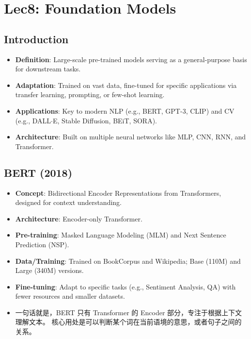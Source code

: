 \documentclass[UTF8]{ctexart}
\begin{document}
\section{Lec8: Foundation Models}
\subsection{Introduction}
\begin{itemize}
    \item \textbf{Definition}: Large-scale pre-trained models serving as a general-purpose basis for downstream tasks.
    \item \textbf{Adaptation}: Trained on vast data, fine-tuned for specific applications via transfer learning, prompting, or few-shot learning.
    \item \textbf{Applications}: Key to modern NLP (e.g., BERT, GPT-3, CLIP) and CV (e.g., DALL$\cdot$E, Stable Diffusion, BEiT, SORA).
    \item \textbf{Architecture}: Built on multiple neural networks like MLP, CNN, RNN, and Transformer.
\end{itemize}

\subsection{BERT (2018)}
\begin{itemize}
    \item \textbf{Concept}: Bidirectional Encoder Representations from Transformers, designed for context understanding.
    \item \textbf{Architecture}: Encoder-only Transformer.
    \item \textbf{Pre-training}: Masked Language Modeling (MLM) and Next Sentence Prediction (NSP).
    \item \textbf{Data/Training}: Trained on BookCorpus and Wikipedia; Base (110M) and Large (340M) versions.
    \item \textbf{Fine-tuning}: Adapt to specific tasks (e.g., Sentiment Analysis, QA) 
    with fewer resources and smaller datasets.
    \item 一句话就是，BERT 只有 Transformer 的 Encoder 部分，专注于根据上下文理解文本。
    核心用处是可以判断某个词在当前语境的意思，或者句子之间的关系。

\end{itemize}
\end{document}
